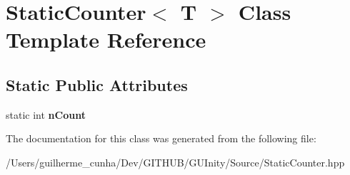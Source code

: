 \hypertarget{class_static_counter}{}\section{Static\+Counter$<$ T $>$ Class Template Reference}
\label{class_static_counter}
\subsection*{Static Public Attributes}
\begin{DoxyCompactItemize}
\item 
\hypertarget{class_static_counter_a6ba3e5bb1cbd9cd9d74c222ae0df2dc4}{}static int {\bfseries n\+Count}\label{class_static_counter_a6ba3e5bb1cbd9cd9d74c222ae0df2dc4}

\end{DoxyCompactItemize}


The documentation for this class was generated from the following file\+:\begin{DoxyCompactItemize}
\item 
/\+Users/guilherme\+\_\+cunha/\+Dev/\+G\+I\+T\+H\+U\+B/\+G\+U\+Inity/\+Source/Static\+Counter.\+hpp\end{DoxyCompactItemize}
